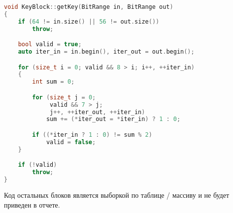 \begin{lstlisting}[language=c++, caption={Класс, реализующий получение ключа}]
void KeyBlock::getKey(BitRange in, BitRange out)
{
    if (64 != in.size() || 56 != out.size())
        throw;

    bool valid = true;
    auto iter_in = in.begin(), iter_out = out.begin();

    for (size_t i = 0; valid && 8 > i; i++, ++iter_in)
    {
        int sum = 0;

        for (size_t j = 0;
             valid && 7 > j;
             j++, ++iter_out, ++iter_in)
            sum += (*iter_out = *iter_in) ? 1 : 0;

        if ((*iter_in ? 1 : 0) != sum % 2)
            valid = false;
    }

    if (!valid)
        throw;
}
\end{lstlisting}

Код остальных блоков является выборкой по таблице / массиву и не будет
приведен в отчете.


